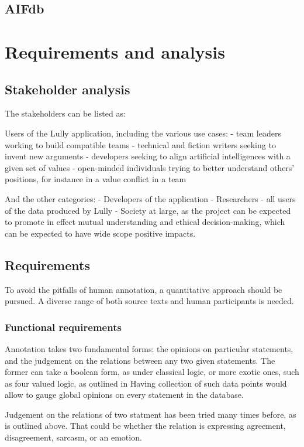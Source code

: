 \documentclass{report}
\begin{document}
\section{AIFdb}

\chapter{Requirements and analysis}

\section{Stakeholder analysis}
The stakeholders can be listed as:

Users of the Lully application, including the various use cases:
- team leaders working to build compatible teams
- technical and fiction writers seeking to invent new arguments
- developers seeking to align artificial intelligences with a given set of values 
- open-minded individuals trying to better understand others' positions, for instance in a value conflict in a team

And the other categories:
- Developers of the application 
- Researchers - all users of the data produced by Lully
- Society at large, as the project can be expected to promote in effect mutual understanding and ethical decision-making, which can be expected to have wide scope positive impacts.

\section{Requirements}
To avoid the pitfalls of human annotation, a quantitative approach should be pursued. A diverse range of both source texts and human participants is needed. 

\subsection{Functional requirements}

Annotation takes two fundamental forms: the opinions on particular statements, and the judgement on the relations between any two given statements.
The former can  take a boolean form, as under classical logic, or more exotic ones, such as four valued logic, as outlined in  \cite{Priest2008}
Having collection of such data points would allow to gauge global opinions on every statement in the database.

Judgement on the relations of two statment has been tried many times before, as is outlined above. That could be whether the relation is expressing agreement, disagreement, sarcasm, or an emotion.
\end{document}
